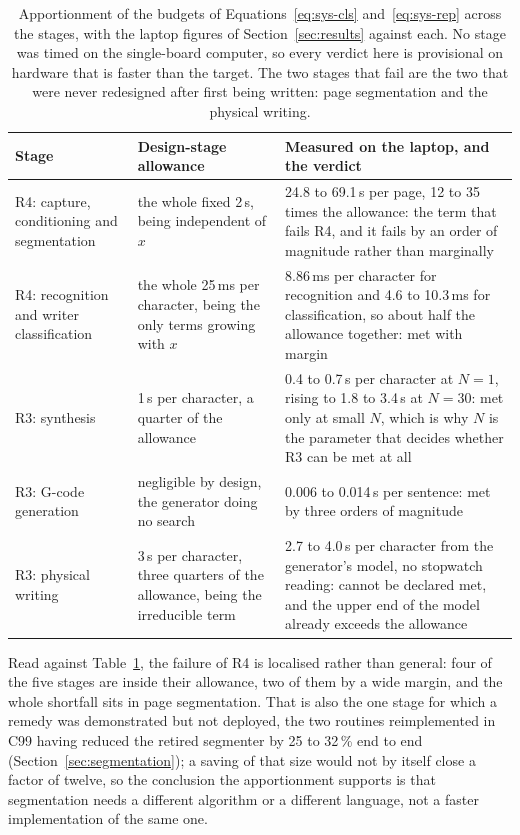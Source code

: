 \begin{table}[!htbp]
\centering
\fontsize{8}{9.6}\selectfont
\setlength{\tabcolsep}{4pt}
\begin{tabularx}{\linewidth}{|p{3.0cm}|p{2.9cm}|X|}
\hline
\textbf{Stage} & \textbf{Design-stage allowance} & \textbf{Measured on the laptop, and the verdict} \\
\hline
R4: capture, conditioning and segmentation & the whole fixed 2\,s, being independent of $x$ & 24.8 to 69.1\,s per page, 12 to 35 times the allowance: the term that fails R4, and it fails by an order of magnitude rather than marginally \\
\hline
R4: recognition and writer classification & the whole 25\,ms per character, being the only terms growing with $x$ & 8.86\,ms per character for recognition and 4.6 to 10.3\,ms for classification, so about half the allowance together: met with margin \\
\hline
R3: synthesis & 1\,s per character, a quarter of the allowance & 0.4 to 0.7\,s per character at $N=1$, rising to 1.8 to 3.4\,s at $N=30$: met only at small $N$, which is why $N$ is the parameter that decides whether R3 can be met at all \\
\hline
R3: G-code generation & negligible by design, the generator doing no search & 0.006 to 0.014\,s per sentence: met by three orders of magnitude \\
\hline
R3: physical writing & 3\,s per character, three quarters of the allowance, being the irreducible term & 2.7 to 4.0\,s per character from the generator's model, no stopwatch reading: cannot be declared met, and the upper end of the model already exceeds the allowance \\
\hline
\end{tabularx}
\caption{Apportionment of the budgets of Equations~\ref{eq:sys-cls} and~\ref{eq:sys-rep} across the stages, with the laptop figures of Section~\ref{sec:results} against each. No stage was timed on the single-board computer, so every verdict here is provisional on hardware that is faster than the target. The two stages that fail are the two that were never redesigned after first being written: page segmentation and the physical writing.}
\label{tab:app-budget}
\end{table}

Read against Table~\ref{tab:app-budget}, the failure of R4 is localised rather than general: four of the five stages are inside their allowance, two of them by a wide margin, and the whole shortfall sits in page segmentation.
That is also the one stage for which a remedy was demonstrated but not deployed, the two routines reimplemented in C99 having reduced the retired segmenter by 25 to 32\,\% end to end (Section~\ref{sec:segmentation}); a saving of that size would not by itself close a factor of twelve, so the conclusion the apportionment supports is that segmentation needs a different algorithm or a different language, not a faster implementation of the same one.

